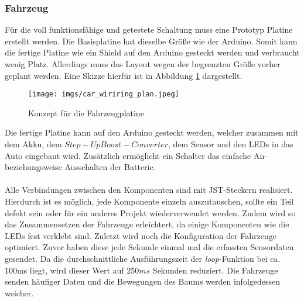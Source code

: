 \documentclass[.../Dokumentation.tex]{subfiles}
\begin{document}
    \subsubsection*{Fahrzeug}
    Für die voll funktionsfähige und getestete Schaltung muss eine Prototyp Platine erstellt werden. Die Basisplatine hat dieselbe Größe wie der Arduino. Somit kann die fertige Platine wie ein Shield auf den Arduino gesteckt werden und verbraucht wenig Platz. Allerdings muss das Layout wegen der begrenzten Größe vorher geplant werden. Eine Skizze hierfür ist in Abbildung \ref{fig-hardware-car-pcb-plan} dargestellt. 
    \begin{figure}[H]
    	\begin{center}
    		\texttt{[image: imgs/car\_wiriring\_plan.jpeg]}
    		\caption{Konzept für die Fahrzeugplatine}
    		\label{fig-hardware-car-pcb-plan}
    	\end{center}
    \end{figure} 
	\noindent
    Die fertige Platine kann auf den Arduino gesteckt werden, welcher zusammen mit dem Akku, dem $Step-Up Boost-Converter$, dem Sensor und den LEDs in das Auto eingebaut wird. Zusätzlich ermöglicht ein Schalter das einfache An- beziehungsweise Ausschalten der Batterie.\\\\
    Alle Verbindungen zwischen den Komponenten sind mit JST-Steckern realisiert. Hierdurch ist es möglich, jede Komponente einzeln auszutauschen, sollte ein Teil defekt sein oder für ein anderes Projekt wiederverwendet werden. Zudem wird so das Zusammensetzen der Fahrzeuge erleichtert, da einige Komponenten wie die LEDs fest verklebt sind.
    Zuletzt wird noch die Konfiguration der Fahrzeuge optimiert. Zuvor haben diese jede Sekunde einmal mal die erfassten Sensordaten gesendet. Da die durchschnittliche Ausführungszeit der \emph{loop}-Funktion bei ca. 100ms liegt, wird dieser Wert auf $250ms$ Sekunden reduziert. Die Fahrzeuge senden häufiger Daten und die Bewegungen des Baums werden infolgedessen weicher.
    
\end{document}
